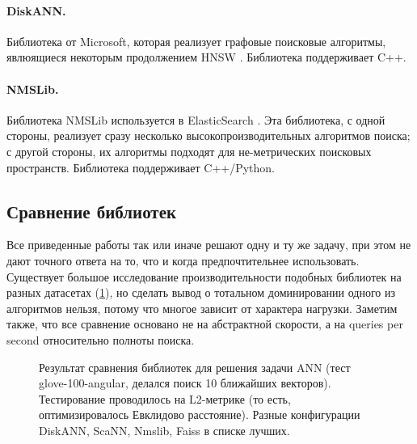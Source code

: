 \documentclass[a4paper,12pt]{extarticle}
\begin{document}
\paragraph{DiskANN.} Библиотека от Microsoft, которая реализует графовые поисковые алгоритмы, явлюящиеся некоторым продолжением HNSW \cite{jayaram2019diskann}. Библиотека поддерживает C++.

\paragraph{NMSLib.} Библиотека NMSLib \cite{Github:nmslib} используется в ElasticSearch \cite{DBLP:conf/sisap/BoytsovN13} \cite{elasticsearch}. Эта библиотека, с одной стороны, реализует сразу несколько высокопроизводительных алгоритмов поиска; с другой стороны, их алгоритмы подходят для не-метрических поисковых пространств. Библиотека поддерживает C++/Python.

\subsection{Сравнение библиотек}

Все приведенные работы так или иначе решают одну и ту же задачу, при этом не дают точного ответа на то, что и когда предпочтительнее использовать. Существует большое исследование производительности подобных библиотек на разных датасетах \cite{annbenchmark} (\cref{ris:benchmark}), но сделать вывод о тотальном доминировании одного из алгоритмов нельзя, потому что многое зависит от характера нагрузки. Заметим также, что все сравнение основано не на абстрактной скорости, а на queries per second относительно полноты поиска.

\begin{center}
\begin{figure}[H]
\caption{Результат сравнения библиотек для решения задачи ANN \cite{annbenchmark} (тест glove-100-angular, делался поиск 10 ближайших векторов). Тестирование проводилось на L2-метрике (то есть, оптимизировалось Евклидово расстояние). Разные конфигурации DiskANN, ScaNN, Nmslib, Faiss в списке лучших.}
\label{ris:benchmark}
\end{figure}
\end{center}
\end{document}
